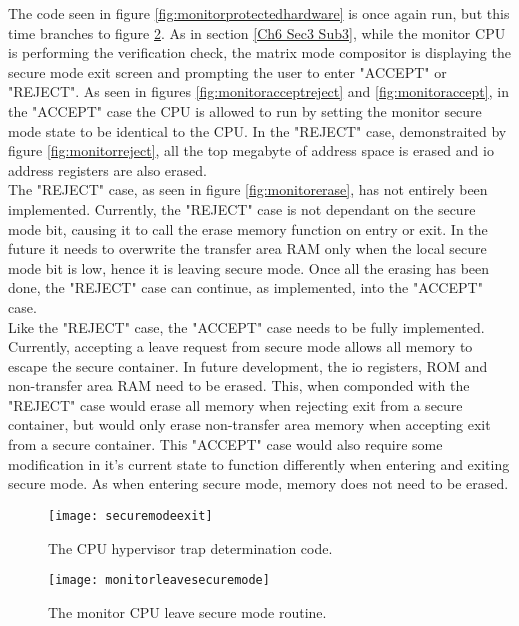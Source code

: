The code seen in figure \ref{fig:monitorprotectedhardware} is once again run, but this time branches to figure \ref{fig:monitorleavesecuremode}. As in section \ref{Ch6 Sec3 Sub3}, while the monitor CPU is performing the verification check, the matrix mode compositor is displaying the secure mode exit screen and prompting the user to enter "ACCEPT" or "REJECT". As seen in figures \ref{fig:monitoracceptreject} and \ref{fig:monitoraccept}, in the "ACCEPT" case the CPU is allowed to run by setting the monitor secure mode state to be identical to the CPU. In the "REJECT" case, demonstraited by figure \ref{fig:monitorreject},  all the top megabyte of address space is erased and io address registers are also erased.\\

The "REJECT" case, as seen in figure \ref{fig:monitorerase}, has not entirely been implemented. Currently, the "REJECT" case is not dependant on the secure mode bit, causing it to call the erase memory function on entry or exit. In the future it needs to overwrite the transfer area RAM only when the local secure mode bit is low, hence it is leaving secure mode. Once all the erasing has been done, the "REJECT" case can continue, as implemented, into the "ACCEPT" case.\\

Like the "REJECT" case, the "ACCEPT" case needs to be fully implemented. Currently, accepting a leave request from secure mode allows all memory to escape the secure container. In future development, the io registers, ROM and non-transfer area RAM need to be erased. This, when componded with the "REJECT" case would erase all memory when rejecting exit from a secure container, but would only erase non-transfer area memory when accepting exit from a secure container. This "ACCEPT" case would also require some modification in it's current state to function differently when entering and exiting secure mode. As when entering secure mode, memory does not need to be erased. 

\begin{figure}
  \centering
  \texttt{[image: securemodeexit]}
  \caption{The CPU hypervisor trap determination code.}
  \label{fig:securemodeexit}
\end{figure}

\begin{figure}
  \centering
  \texttt{[image: monitorleavesecuremode]}
  \caption{The monitor CPU leave secure mode routine.}
  \label{fig:monitorleavesecuremode}
\end{figure}

